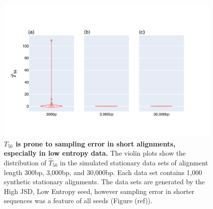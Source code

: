 \begin{figure}[htbp]
\centering
\includegraphics[width=\textwidth]{figures/plots/synthetic/T50/HighJSDLowEntropy-seq_len.pdf}\caption{\textbf{$T_{50}$ is prone to sampling error in short alignments, especially in low entropy data.} The violin plots show the distribution of $\hat T_{50}$ in the simulated stationary data sets of alignment length 300bp, 3,000bp, and 30,000bp. Each data set contains 1,000 synthetic stationary alignments. The data sets are generated by the High JSD, Low Entropy seed, however sampling error in shorter sequences was a feature of all seeds (Figure (ref)). }
\label{fig:T50-short_long}
\end{figure}